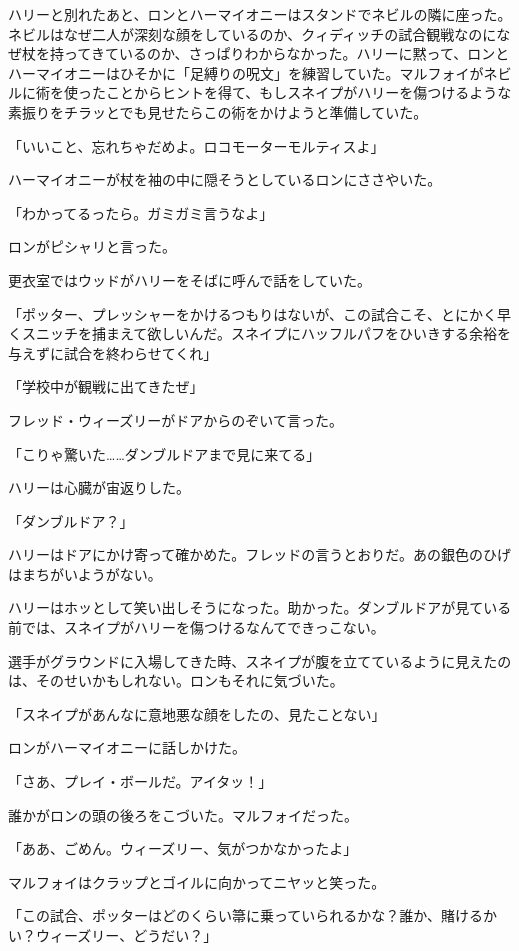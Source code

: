 \documentclass[10pt,a4paper]{article}
\begin{document}
\begin{CJK}{UTF8}{min}
ハリーと別れたあと、ロンとハーマイオニーはスタンドでネビルの隣に座った。ネビルはなぜ二人が深刻な顔をしているのか、クィディッチの試合観戦なのになぜ杖を持ってきているのか、さっぱりわからなかった。ハリーに黙って、ロンとハーマイオニーはひそかに「足縛りの呪文」を練習していた。マルフォイがネビルに術を使ったことからヒントを得て、もしスネイプがハリーを傷つけるような素振りをチラッとでも見せたらこの術をかけようと準備していた。

「いいこと、忘れちゃだめよ。ロコモーターモルティスよ」

ハーマイオニーが杖を袖の中に隠そうとしているロンにささやいた。

「わかってるったら。ガミガミ言うなよ」

ロンがピシャリと言った。

更衣室ではウッドがハリーをそばに呼んで話をしていた。

「ポッター、プレッシャーをかけるつもりはないが、この試合こそ、とにかく早くスニッチを捕まえて欲しいんだ。スネイプにハッフルパフをひいきする余裕を与えずに試合を終わらせてくれ」

「学校中が観戦に出てきたぜ」

フレッド・ウィーズリーがドアからのぞいて言った。

「こりゃ驚いた……ダンブルドアまで見に来てる」

ハリーは心臓が宙返りした。

「ダンブルドア？」

ハリーはドアにかけ寄って確かめた。フレッドの言うとおりだ。あの銀色のひげはまちがいようがない。

ハリーはホッとして笑い出しそうになった。助かった。ダンブルドアが見ている前では、スネイプがハリーを傷つけるなんてできっこない。

選手がグラウンドに入場してきた時、スネイプが腹を立てているように見えたのは、そのせいかもしれない。ロンもそれに気づいた。

「スネイプがあんなに意地悪な顔をしたの、見たことない」

ロンがハーマイオニーに話しかけた。

「さあ、プレイ・ボールだ。アイタッ！」

誰かがロンの頭の後ろをこづいた。マルフォイだった。

「ああ、ごめん。ウィーズリー、気がつかなかったよ」

マルフォイはクラップとゴイルに向かってニヤッと笑った。

「この試合、ポッターはどのくらい箒に乗っていられるかな？誰か、賭けるかい？ウィーズリー、どうだい？」


\end{CJK}
\end{document}

